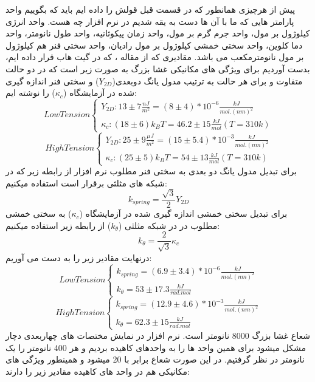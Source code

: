 \documentclass[12pt,onecolumn,a4paper]{report}
\begin{document}
پیش از هرچیزی همانطور که در قسمت قبل قولش را داده ایم باید که بگوییم واحد پارامتر هایی که ما با آن ها دست به یقه شدیم در نرم افزار چه هست.  واحد انرژی کیلوژول بر مول، واحد جرم گرم بر مول، واحد زمان پیکوثانیه، واحد طول نانومتر، واحد دما کلوین، واحد سختی خمشی کیلوژول بر مول رادیان، واحد سختی فنر هم کیلوژول بر مول نانومترمکعب می باشد.
مقادیری  که از مقاله  ، که در گیت هاب قرار داده ایم، بدست آوردیم برای ویژگی های مکانیکی غشا بزرگ به صورت زیر است که در دو حالت متفاوت و برای هر حالت به ترتیب مدول یانگ دوبعدی(\begin{math} Y_{2D} \end{math}) و سختی فنر اندازه گیری شده در آزمایشگاه (\begin{math} \kappa_c \end{math}) را نوشته ایم:
\[ Low Tension 
  \begin{cases}
    Y_{2D} : 13 \pm 7 \frac{nJ}{m^2} = (8 \pm 4) * 10^{-6} \frac{kJ}{mol.(nm)^2}\\
    \kappa_c : (18 \pm 6)k_{B}T = 46.2 \pm 15 \frac{kJ}{mol}    (T=310k)
  \end{cases}
\]
\[ High Tension 
  \begin{cases}
    Y_{2D} : 25 \pm 9 \frac{\mu J}{m^2} = (15 \pm 5.4) * 10^{-3}\frac{ kJ}{mol.(nm)^2}\\
    \kappa_c : (25 \pm 5)k_{B}T = 54 \pm 13 \frac{kJ}{mol}    (T=310k)
  \end{cases}
\]
برای تبدیل مدول یانگ دو بعدی به سختی فنر مطلوب نرم افزار از رابطه  زیر که در شبکه های مثلثی برقرار است استفاده میکنیم:
$$
k_{spring} = \frac{\sqrt{3}}{2}Y_{2D}
$$
برای تبدیل سختی خمشی اندازه گیری شده در آزمایشگاه (\begin{math} \kappa_c \end{math}) به سختی خمشی مطلوب در  در شبکه مثلثی (\begin{math} k_\theta \end{math}) از رابطه زیر استفاده میکنیم:
$$
k_\theta = \frac{2}{\sqrt{3}}\kappa_c
$$
درنهایت مقادیر زیر را به دست می آوریم:
\[ Low Tension 
  \begin{cases}
    k_{spring} = (6.9 \pm 3.4)*10^{-6} \frac{kJ}{mol.(nm)^2}\\
    k_\theta = 53 \pm 17.3 \frac{kJ}{rad.mol}
  \end{cases}
\]
\[ High Tension 
  \begin{cases}
    k_{spring} = (12.9 \pm 4.6)*10^{-3} \frac{kJ}{mol.(nm)^2}\\
    k_\theta = 62.3 \pm 15 \frac{kJ}{rad.mol}
  \end{cases}
\]
شعاع غشا بزرگ 8000 نانومتر است. نرم افزار   در نمایش مختصات های چهاربعدی دچار مشکل میشود برای همین واحد ها را به واحدهای کاهیده بردیم و هر 400 نانومتر را یک نانومتر در نظر گرفتیم. در این صورت شعاع برابر با 20 میشود و همینطور ویژگی های مکانیکی هم در واحد های کاهیده مقادیر زیر را دارند:
\end{document}
